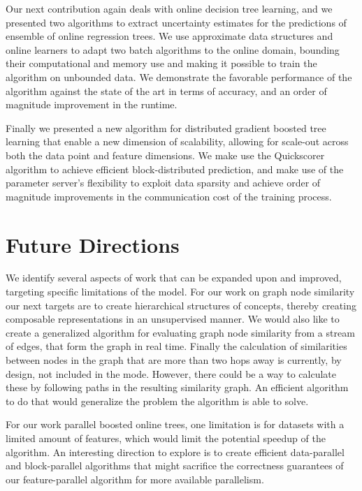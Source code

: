 Our next contribution again deals with online decision tree learning,
and we presented two algorithms to extract uncertainty estimates
for the predictions of ensemble of online regression trees.
We use approximate data structures and online learners to
adapt two batch algorithms to the online domain, bounding
their computational and memory use and making it possible
to train the algorithm on unbounded data. We demonstrate the
favorable performance of the algorithm against the state of
the art in terms of accuracy, and an order of magnitude improvement
in the runtime.

Finally we presented a new algorithm for distributed gradient boosted tree
learning that enable a new dimension of scalability, allowing for scale-out
across both the data point and feature dimensions. We make use the Quickscorer
algorithm to achieve efficient block-distributed prediction, and make use
of the parameter server's flexibility to exploit data sparsity and achieve
order of magnitude improvements in the communication cost of the training process.

\section{Future Directions}

We identify several aspects of work that can be expanded upon and improved,
targeting specific limitations of the model. For our work on graph node similarity
our next targets are to create hierarchical structures of concepts, thereby creating
composable representations in an unsupervised manner. We would also like to create
a generalized algorithm for evaluating graph node similarity from a stream of edges,
that form the graph in real time. Finally the calculation of similarities between
nodes in the graph that are more than two hops away is currently, by design, not included
in the mode. However, there could be a way to calculate these by following paths in
the resulting similarity graph. An efficient algorithm to do that would generalize
the problem the algorithm is able to solve.

For our work parallel boosted online trees, one limitation is for datasets with
a limited amount of features, which would limit the potential speedup of the
algorithm.
An interesting direction to explore is to
create efficient data-parallel and block-parallel algorithms that might sacrifice
the correctness guarantees of our feature-parallel algorithm for more available
parallelism.

